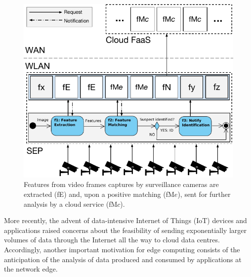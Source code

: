 \documentclass[letterpaper, 10 pt, conference]{ieeeconf}  %
\begin{document}
\begin{figure}[tbp]
	\centering
	\includegraphics[width=\linewidth]{Figs/Edge_Data_Analytics_Video_Surveillance.pdf}
	\caption{Features from video frames captures by surveillance cameras are extracted (fE) and, upon a positive matching (fM$e$), sent for further analysis by a cloud service (fM$c$).}
	\label{fig:Edge_Data_Analytics_Video_Surveillance}
\end{figure}

More recently, the advent of data-intensive Internet of Things (IoT) devices and applications raised concerns about the feasibility of sending exponentially larger volumes of data through the Internet all the way to cloud data centres. Accordingly, another important motivation for edge computing consists of the anticipation of the analysis of data produced and consumed by applications at the network edge. 

\end{document}
